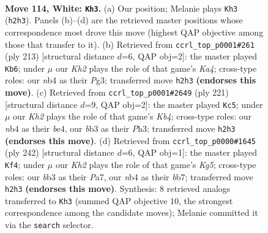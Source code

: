 \documentclass[11pt]{article}
\begin{document}
\clearpage

\begin{figure}[p]\centering
\begin{subfigure}{0.46\textwidth}\centering
\resizebox{\linewidth}{!}{%
\newchessgame
\chessboard[
  setfen={8/8/8/7k/1n1B4/1b6/5P1K/8 w - - 73 114},
  showmover=false,
  pgfstyle=straightmove, color=movearrow, markmove={h2-h3}
]}
\caption{}
\end{subfigure}\hfill
\begin{subfigure}{0.46\textwidth}\centering
\resizebox{\linewidth}{!}{%
\newchessgame
\chessboard[
  setfen={8/4b3/2B5/k1p5/8/1K4p1/8/8 b - - 85 107},
  showmover=false,
  pgfstyle=straightmove, color=movearrow, markmove={a5-b6}
]}
\caption{}
\end{subfigure}
\\[4pt]
\begin{subfigure}{0.46\textwidth}\centering
\resizebox{\linewidth}{!}{%
\newchessgame
\chessboard[
  setfen={8/8/8/1k2b3/4B3/6pp/8/5K2 b - - 63 111},
  showmover=false,
  pgfstyle=straightmove, color=movearrow, markmove={b5-c5}
]}
\caption{}
\end{subfigure}\hfill
\begin{subfigure}{0.46\textwidth}\centering
\resizebox{\linewidth}{!}{%
\newchessgame
\chessboard[
  setfen={5B2/Pb6/4k3/2P3K1/8/8/8/8 w - - 13 122},
  showmover=false,
  pgfstyle=straightmove, color=movearrow, markmove={g5-f4}
]}
\caption{}
\end{subfigure}
\caption{\textbf{Move 114, White: \texttt{Kh3}.} (a) Our position; Melanie plays \texttt{Kh3} (\texttt{h2h3}). Panels (b)--(d) are the retrieved master positions whose correspondence most drove this move (highest QAP objective among those that transfer to it). (b) Retrieved from \texttt{ccrl\_top\_p0001\#261} (ply 213) [structural distance $d$=6, QAP obj=2]: the master played \texttt{Kb6}; under $\mu$ our \emph{Kh2} plays the role of that game's \emph{Ka4}; cross-type roles: our \emph{n}b4 as their \emph{P}g3; transferred move \texttt{h2h3} \textbf{(endorses this move)}. (c) Retrieved from \texttt{ccrl\_top\_p0001\#2649} (ply 221) [structural distance $d$=9, QAP obj=2]: the master played \texttt{Kc5}; under $\mu$ our \emph{Kh2} plays the role of that game's \emph{Kb4}; cross-type roles: our \emph{n}b4 as their \emph{b}e4, our \emph{b}b3 as their \emph{P}h3; transferred move \texttt{h2h3} \textbf{(endorses this move)}. (d) Retrieved from \texttt{ccrl\_top\_p0000\#1645} (ply 242) [structural distance $d$=6, QAP obj=1]: the master played \texttt{Kf4}; under $\mu$ our \emph{Kh2} plays the role of that game's \emph{Kg5}; cross-type roles: our \emph{b}b3 as their \emph{P}a7, our \emph{n}b4 as their \emph{b}b7; transferred move \texttt{h2h3} \textbf{(endorses this move)}. Synthesis: 8 retrieved analogs transferred to \texttt{Kh3} (summed QAP objective 10, the strongest correspondence among the candidate moves); Melanie committed it via the \texttt{search} selector.}
\label{fig:thought-m226}
\end{figure}
\end{document}
